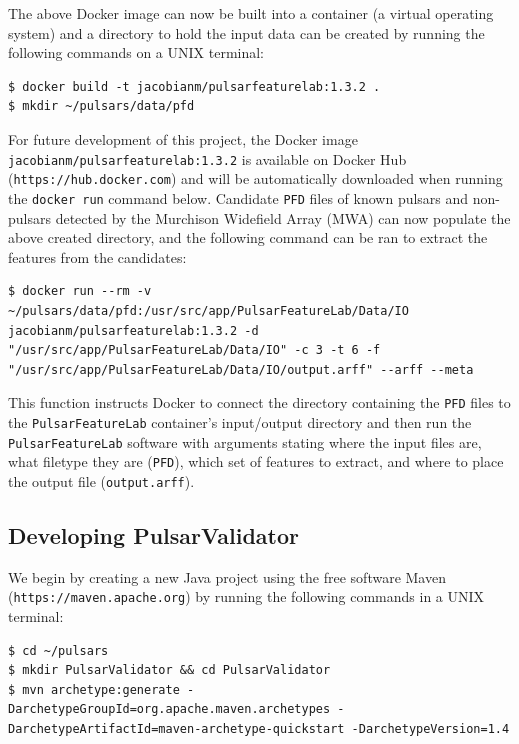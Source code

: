 \documentclass{article}
\begin{document}
\begin{appendices}
\begin{subappendices}
        The above Docker image can now be built into a container (a virtual operating system) and a directory to hold the input data can be created by running the following commands on a UNIX terminal:

        \begin{lstlisting}[numbers=none]
$ docker build -t jacobianm/pulsarfeaturelab:1.3.2 .
$ mkdir ~/pulsars/data/pfd
        \end{lstlisting}

        For future development of this project, the Docker image \\\verb|jacobianm/pulsarfeaturelab:1.3.2| is available on Docker Hub\\(\verb|https://hub.docker.com|) and will be automatically downloaded when running the \verb|docker run| command below. Candidate \verb|PFD| files of known pulsars and non-pulsars detected by the Murchison Widefield Array (MWA) can now populate the above created directory, and the following command can be ran to extract the features from the candidates:

        \begin{lstlisting}[numbers=none]
$ docker run --rm -v ~/pulsars/data/pfd:/usr/src/app/PulsarFeatureLab/Data/IO jacobianm/pulsarfeaturelab:1.3.2 -d "/usr/src/app/PulsarFeatureLab/Data/IO" -c 3 -t 6 -f "/usr/src/app/PulsarFeatureLab/Data/IO/output.arff" --arff --meta
        \end{lstlisting}

        This function instructs Docker to connect the directory containing the \verb|PFD| files to the \verb|PulsarFeatureLab| container's input/output directory and then run the \verb|PulsarFeatureLab| software with arguments stating where the input files are, what filetype they are (\verb|PFD|), which set of features to extract, and where to place the output file (\verb|output.arff|).

        \subsection{Developing PulsarValidator}
        \label{apndx:pulsarvalidator}
        We begin by creating a new Java project using the free software Maven (\verb|https://maven.apache.org|) by running the following commands in a UNIX terminal:

        \begin{lstlisting}[numbers=none]
$ cd ~/pulsars
$ mkdir PulsarValidator && cd PulsarValidator
$ mvn archetype:generate -DarchetypeGroupId=org.apache.maven.archetypes -DarchetypeArtifactId=maven-archetype-quickstart -DarchetypeVersion=1.4
        \end{lstlisting}
        

\end{subappendices}
\end{appendices}
\end{document}
